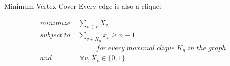 \documentclass{beamer}
\begin{document}
\begin{frame}{Minimum Vertex Cover}
Every edge is also a clique:


\begin{align*}
&minimize \; \;\; \; \sum_{v\in V}X_v\\
&subject\; to \;\;\; \; \sum_{v\in K_n}x_v \geq n - 1\\
& \qquad\qquad \qquad\qquad for\; every\; maximal\; clique\; K_n\; in\; the\; graph\\
&and	\qquad\qquad	 \forall v, X_v\in \{0,1\}
\end{align*}



\end{frame}
\begin{comment}

\begin{frame}{Maximal Clique}


\begin{algorithm}[H]
\begin{algorithmic}[1]

\STATE BronKerbosch({$R, P, X$})\\

        \IF{$P$ and $X$ are both empty}{
        
		  	 report $R$ as a maximal clique\\	
		 }\ENDIF
		\FOR{vertex $v$ in $P$}{
		
			   BronKerbosch$(R \cup \{v\}, P \cap N(v), X \cap N(v))$
			   
			    $P := P\setminus \{v\}$
			    
			   	   $X := X\cup \{v\}$\\
		}\ENDFOR

\end{algorithmic}
\caption{Bron-Kerbosch}
\end{algorithm}

\end{frame}
\end{comment}
\end{document}
